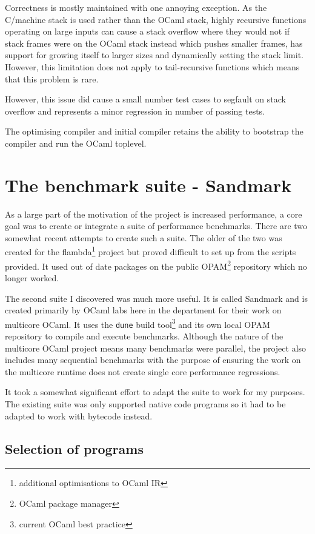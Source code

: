 Correctness is mostly maintained with one annoying exception. As the C/machine stack is used rather
than
the OCaml stack, highly recursive functions operating on large inputs can cause a stack overflow
where they would not if stack frames were on the OCaml stack instead which pushes smaller frames,
has support for growing itself to larger sizes and dynamically setting the stack limit. However,
this limitation does not apply to tail-recursive functions which means that this problem is rare.

However, this issue did cause a small number test cases to segfault on stack overflow and
represents
a minor regression in number of passing tests.

The optimising compiler and initial compiler retains the ability to bootstrap the compiler and run
the OCaml toplevel.

\section{The benchmark suite - Sandmark}

As a large part of the motivation of the project is increased performance, a core goal was to
create or
integrate a suite of performance benchmarks. There are two somewhat recent attempts to create such
a
suite. The older of the two was created for the flambda\footnote{additional optimisations to OCaml
    IR} project but proved difficult to set up from the scripts provided. It used out of date
packages
on the public OPAM\footnote{OCaml package manager} repository which no longer worked.

The second suite I discovered was much more useful. It is called Sandmark and is created primarily
by OCaml labs here in the department for their work on multicore OCaml. It uses the \texttt{dune}
build tool\footnote{current OCaml best practice} and its own local OPAM repository to compile and
execute benchmarks. Although the nature of the multicore OCaml project means many benchmarks were
parallel, the project also includes many sequential benchmarks with the purpose of ensuring the
work
on the multicore runtime does not create single core performance regressions.

It took a somewhat significant effort to adapt the suite to work for my purposes. The existing
suite was
only supported native code programs so it had to be adapted to work with bytecode instead.

\subsection{Selection of programs}

